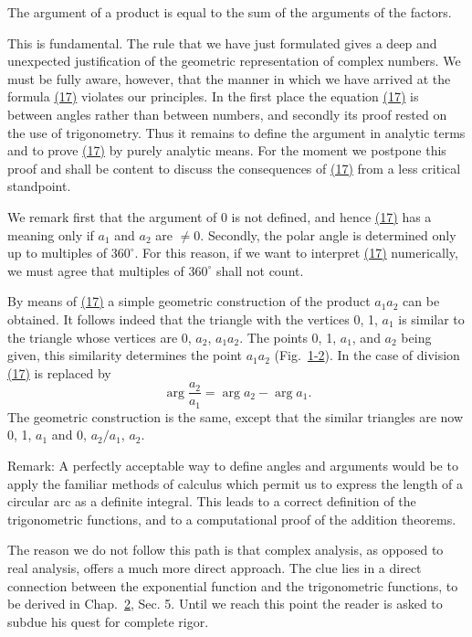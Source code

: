The argument of a product is equal to the sum of the arguments of the factors.

This is fundamental. The rule that we have just formulated gives a deep and unexpected justification of the geometric representation of complex numbers. We must be fully aware, however, that the manner in which we have arrived at the formula \hyperref[eq:1.17]{(17)} violates our principles. In the
first place the equation \hyperref[eq:1.17]{(17)} is between angles rather than between numbers, and secondly its proof rested on the use of trigonometry. Thus it remains to define the argument in analytic terms and to prove \hyperref[eq:1.17]{(17)} by purely analytic means. For the moment we postpone this proof and shall be content to discuss the consequences of \hyperref[eq:1.17]{(17)} from a less critical standpoint.

We remark first that the argument of 0 is not defined, and hence \hyperref[eq:1.17]{(17)} has a meaning only if $a_1$ and $a_2$ are $\neq 0$. Secondly, the polar angle is determined only up to multiples of $360^\circ$. For this reason, if we want to interpret \hyperref[eq:1.17]{(17)} numerically, we must agree that multiples of $360^\circ$ shall not count.

By means of \hyperref[eq:1.17]{(17)} a simple geometric construction of the product $a_{1}a_{2}$ can be obtained. It follows indeed that the triangle with the vertices 0, 1, $a_{1}$ is similar to the triangle whose vertices are 0, $a_{2}$, $a_{1}a_{2}$. The points 0, 1, $a_{1}$, and $a_{2}$ being given, this similarity determines the point $a_{1}a_{2}$ (Fig.~\hyperref[fig:1-2]{1-2}). In the case of division \hyperref[eq:1.17]{(17)} is replaced by
\begin{equation*}
\arg \frac {a _ {2}}{a _ {1}} = \arg a _ {2} - \arg a _ {1}.\tag{18}\label{eq:1.18}
\end{equation*}
The geometric construction is the same, except that the similar triangles are now 0, 1, $a_1$ and 0, $a_2 / a_1$, $a_2$.

Remark: A perfectly acceptable way to define angles and arguments would be to apply the familiar methods of calculus which permit us to express the length of a circular arc as a definite integral. This leads to a correct definition of the trigonometric functions, and to a computational proof of the addition theorems.

The reason we do not follow this path is that complex analysis, as
opposed to real analysis, offers a much more direct approach. The clue lies in a direct connection between the exponential function and the trigonometric functions, to be derived in Chap.~\hyperref[chap:2]{2}, Sec. 5. Until we reach this point the reader is asked to subdue his quest for complete rigor.

